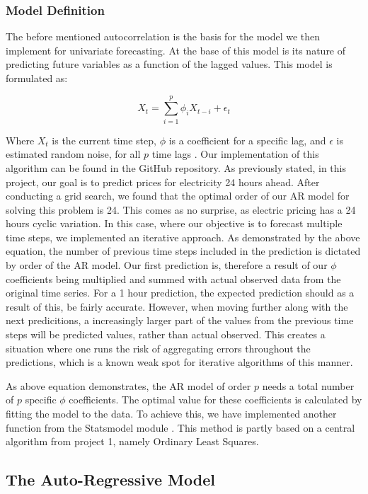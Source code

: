 \documentclass
[twocolumn,
secnumarabic,
nobibnotes,
aps,
prl,
reprint,
groupedaddress,
amsmath,
amssymb,
]{revtex4-2}
\begin{document}
\subsubsection{Model Definition}

The before mentioned autocorrelation is the basis for the model we then implement for univariate forecasting. At the base of this model is its nature of predicting future variables as a function of the lagged values. This model is formulated as:

\[
X_t = \sum_{i=1}^{p} \phi_i X_{t-i} + \epsilon_{t}
\]

Where $X_t$ is the current time step, $\phi$ is a coefficient for a specific lag, and $\epsilon$ is estimated random noise, for all $p$ time lags \cite{Korstanje2021}. Our implementation of this algorithm can be found in the GitHub repository. As previously stated, in this project, our goal is to predict prices for electricity 24 hours ahead. After conducting a grid search, we found that the optimal order of our AR model for solving this problem is 24. This comes as no surprise, as electric pricing has a 24 hours cyclic variation. In this case, where our objective is to forecast multiple time steps, we implemented an iterative approach. As demonstrated by the above equation, the number of previous time steps included in the prediction is dictated by order of the AR model. Our first prediction is, therefore a result of our $\phi$ coefficients being multiplied and summed with actual observed data from the original time series. For a 1 hour prediction, the expected prediction should as a result of this, be fairly accurate. However, when moving further along with the next predicitions, a increasingly larger part of the values from the previous time steps will be predicted values, rather than actual observed. This creates a situation where one runs the risk of aggregating errors throughout the predictions, which is a known weak spot for iterative algorithms of this manner. 

As above equation demonstrates, the AR model of order $p$ needs a total number of $p$ specific $\phi$ coefficients. The optimal value for these coefficients is calculated by fitting the model to the data. To achieve this, we have implemented another function from the Statsmodel module \cite{seabold2010statsmodels}. This method is partly based on a central algorithm from project 1, namely Ordinary Least Squares\cite{Korstanje2021}.



\subsection{The Auto-Regressive Model}
\end{document}
